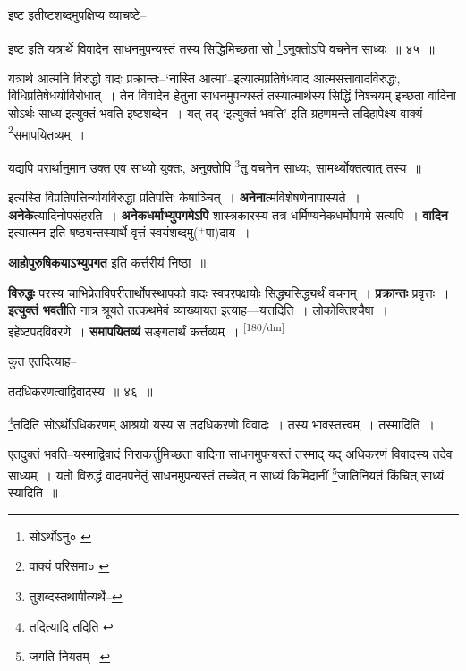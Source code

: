 \documentclass[article,12pt,a4paper]{memoir}
\newcommand{\add}[1]{($^{+}$#1)}
\begin{document}
	  \pstart इष्ट इतीष्टशब्दमुपक्षिप्य व्याचष्टे--
	\pend
       

	  \pstart इष्ट इति यत्रार्थे विवादेन साधनमुपन्यस्तं तस्य सिद्धिमिच्छता सो \footnote{सोऽर्थोऽनु० \cite{dp-msC}}ऽनुक्तोऽपि वचनेन साध्यः ॥ ४५ ॥
	\pend
       

	  \pstart यत्रार्थ आत्मनि विरुद्धो वादः प्रक्रान्तः--‘नास्ति आत्मा’--इत्यात्मप्रतिषेधवाद आत्मसत्तावादविरुद्धः, विधिप्रतिषेधयोर्विरोधात् । तेन विवादेन हेतुना साधनमुपन्यस्तं तस्यात्मार्थस्य सिद्धिं निश्चयम् इच्छता वादिना सोऽर्थः साध्य इत्युक्तं भवति इष्टशब्देन । यत् तद् ‘इत्युक्तं भवति’ इति ग्रहणमन्ते तदिहापेक्ष्य वाक्यं \footnote{वाक्यं परिसमा० \cite{dp-msA} \cite{dp-msB} \cite{dp-msC} \cite{dp-msD} \cite{dp-edP} \cite{dp-edH} \cite{dp-edE} \cite{dp-edN}}समापयितव्यम् ।
	\pend
       

	  \pstart यद्यपि परार्थानुमान उक्त एव साध्यो युक्तः, अनुक्तोपि \footnote{तुशब्दस्तथापीत्यर्थे--\cite{dp-msD-n}}तु वचनेन साध्यः, सामर्थ्योक्तत्वात् तस्य ॥
	\pend
      

	  \pstart इत्यस्ति विप्रतिपत्तिर्न्यायविरुद्धा प्रतिपत्तिः केषाञ्चित् । \textbf{अनेना}त्मविशेषणेनापास्यते । \textbf{अनेके}त्यादिनोपसंहरति । \textbf{अनेकधर्माभ्युपगमेऽपि} शास्त्रकारस्य तत्र धर्मिण्यनेकधर्मोपगमे सत्यपि । \textbf{वादिन} इत्यात्मन इति षष्ठ्यन्तस्यार्थे वृत्तं स्वयंशब्दमु\add{पा}दाय ।
	\pend
      

	  \pstart \textbf{आहोपुरुषिकयाऽभ्युपगत} इति कर्त्तरीयं निष्ठा ॥
	\pend
      

	  \pstart \textbf{विरुद्धः} परस्य चाभिप्रेतविपरीतार्थोपस्थापको वादः स्वपरपक्षयोः सिद्ध्यसिद्ध्यर्थं वचनम् । \textbf{प्रक्रान्तः} प्रवृत्तः । \textbf{इत्युक्तं भवती}ति नात्र श्रूयते तत्कथमेवं व्याख्यायत इत्याह—यत्तदिति । लोकोक्तिश्चैषा । इहेष्टपदविवरणे । \textbf{समापयितव्यं} सङ्गतार्थं कर्त्तव्यम् ।
	\pend
      \leavevmode\textsuperscript{\rmlatinfont\tiny [180/dm]}

	  \pstart कुत एतदित्याह--
	\pend
       

	  \pstart तदधिकरणत्वाद्विवादस्य ॥ ४६ ॥
	\pend
       

	  \pstart \footnote{तदित्यादि तदिति \cite{dp-msA} \cite{dp-msB} \cite{dp-msC} \cite{dp-msD} \cite{dp-edP} \cite{dp-edH} \cite{dp-edE} \cite{dp-edN}}तदिति सोऽर्थोऽधिकरणम् आश्रयो यस्य स तदधिकरणो विवादः । तस्य भावस्तत्त्वम् । तस्मादिति ।
	\pend
       

	  \pstart एतदुक्तं भवति--यस्माद्विवादं निराकर्त्तुमिच्छता वादिना साधनमुपन्यस्तं तस्माद् यद् अधिकरणं विवादस्य तदेव साध्यम् । यतो विरुद्धं वादमपनेतुं साधनमुपन्यस्तं तच्चेत् न साध्यं किमिदानीं \footnote{जगति नियतम्--\cite{dp-msB} \cite{dp-msC} \cite{dp-msD} \cite{dp-edP} \cite{dp-edH} \cite{dp-edE} \cite{dp-edN}}जातिनियतं किंचित् साध्यं स्यादिति ॥
	\pend
       
\end{document}

